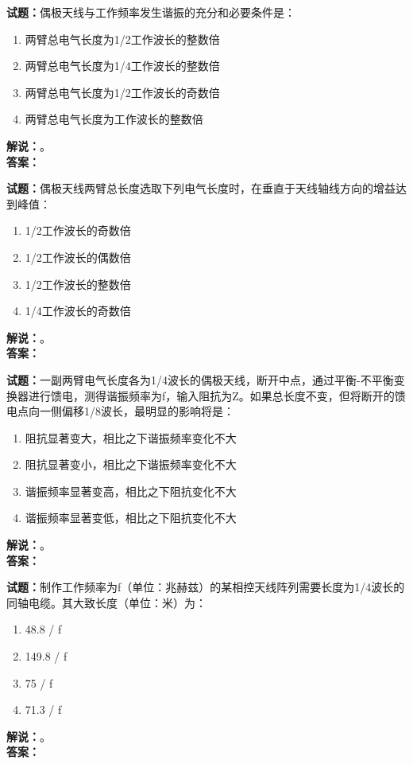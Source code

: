 \documentclass{ctexbook}
\begin{document}
\bigskip

\noindent\textbf{试题：}偶极天线与工作频率发生谐振的充分和必要条件是：
\begin{enumerate}[leftmargin=3em]
  \item 两臂总电气长度为1/2工作波长的整数倍
  \item 两臂总电气长度为1/4工作波长的整数倍
  \item 两臂总电气长度为1/2工作波长的奇数倍
  \item 两臂总电气长度为工作波长的整数倍
\end{enumerate}
\noindent\textbf{解说：}\textbf{}。\\\noindent\textbf{答案：}

\bigskip

\noindent\textbf{试题：}偶极天线两臂总长度选取下列电气长度时，在垂直于天线轴线方向的增益达到峰值：
\begin{enumerate}[leftmargin=3em]
  \item 1/2工作波长的奇数倍
  \item 1/2工作波长的偶数倍
  \item 1/2工作波长的整数倍
  \item 1/4工作波长的奇数倍
\end{enumerate}
\noindent\textbf{解说：}\textbf{}。\\\noindent\textbf{答案：}

\bigskip

\noindent\textbf{试题：}一副两臂电气长度各为1/4波长的偶极天线，断开中点，通过平衡-不平衡变换器进行馈电，测得谐振频率为f，输入阻抗为Z。如果总长度不变，但将断开的馈电点向一侧偏移1/8波长，最明显的影响将是：
\begin{enumerate}[leftmargin=3em]
  \item 阻抗显著变大，相比之下谐振频率变化不大
  \item 阻抗显著变小，相比之下谐振频率变化不大
  \item 谐振频率显著变高，相比之下阻抗变化不大
  \item 谐振频率显著变低，相比之下阻抗变化不大
\end{enumerate}
\noindent\textbf{解说：}\textbf{}。\\\noindent\textbf{答案：}

\bigskip

\noindent\textbf{试题：}制作工作频率为f（单位：兆赫兹）的某相控天线阵列需要长度为1/4波长的同轴电缆。其大致长度（单位：米）为：
\begin{enumerate}[leftmargin=3em]
  \item 48.8 / f
  \item 149.8 / f
  \item 75 / f
  \item 71.3 / f
\end{enumerate}
\noindent\textbf{解说：}\textbf{}。\\\noindent\textbf{答案：}
\end{document}
